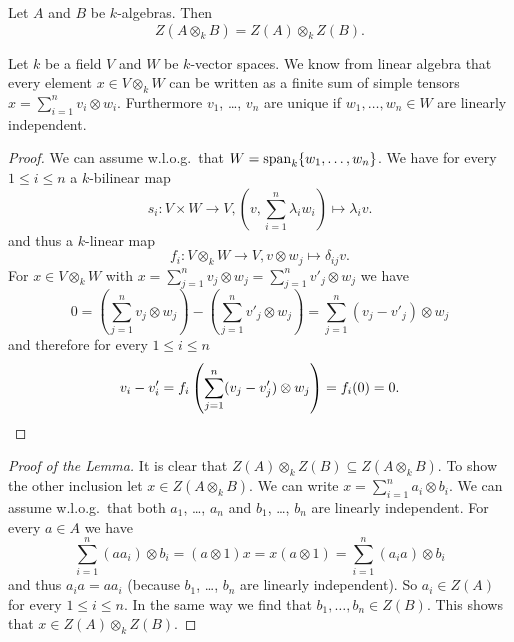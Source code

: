 \begin{lem}\label{lem: Z(A o B) = Z(A) o Z(B)}
  Let $A$ and $B$ be $k$-algebras.
  Then
  \[
      Z(A \otimes_k B)
    = Z(A) \otimes_k Z(B).
  \]
\end{lem}


\begin{rec}
  Let $k$ be a field $V$ and $W$ be $k$-vector spaces.
  We know from linear algebra that every element $x \in V \otimes_k W$ can be written as a finite sum of simple tensors $x = \sum_{i=1}^n v_i \otimes w_i$.
  Furthermore $v_1$, \dots, $v_n$ are unique if $w_1, \dotsc, w_n \in W$ are linearly independent.
  \begin{proof}
    We can assume w.l.o.g.\ that $W = \operatorname{span}_k \{w_1, \dotsc, w_n\}$.
    We have for every $1 \leq i \leq n$ a $k$-bilinear map
    \[
              s_i
      \colon  V \times W \to V,
              \left(v, \sum_{i=1}^n \lambda_i w_i\right)
      \mapsto \lambda_i v.
    \]
    and thus a $k$-linear map
    \[
              f_i
      \colon  V \otimes_k W
      \to     V,
              v \otimes w_j
      \mapsto \delta_{ij} v.
    \]
    For $x \in V \otimes_k W$ with $x = \sum_{j=1}^n v_j \otimes w_j = \sum_{j=1}^n v'_j \otimes w_j$ we have
    \[
        0
      =   \left( \sum_{j=1}^n v_j \otimes w_j \right)
        - \left( \sum_{j=1}^n v'_j \otimes w_j \right)
      = \sum_{j=1}^n (v_j - v'_j) \otimes w_j
    \]
    and therefore for every $1 \leq i \leq n$
    \[
        v_i - v'_i
      = f_i\left( \sum_{j=1}^n (v_j - v'_j) \otimes w_j\right)
      = f_i(0)
      = 0.
      \qedhere
    \]
  \end{proof}
\end{rec}


\begin{proof}[Proof of the Lemma]
  It is clear that $Z(A) \otimes_k Z(B) \subseteq Z(A \otimes_k B)$.
  To show the other inclusion let $x \in Z(A \otimes_k B)$.
  We can write $x = \sum_{i=1}^n a_i \otimes b_i$.
  We can assume w.l.o.g.\ that both $a_1$, \dots, $a_n$ and $b_1$, \dots, $b_n$ are linearly independent.
  For every $a \in A$ we have
  \[
      \sum_{i=1}^n (a a_i) \otimes b_i
    = (a \otimes 1) x
    = x (a \otimes 1)
    = \sum_{i=1}^n (a_i a) \otimes b_i
  \]
  and thus $a_i a = a a_i$ (because $b_1$, \dots, $b_n$ are linearly independent).
  So $a_i \in Z(A)$ for every $1 \leq i \leq n$.
  In the same way we find that $b_1, \dotsc, b_n \in Z(B)$.
  This shows that $x \in Z(A) \otimes_k Z(B)$.
\end{proof}


